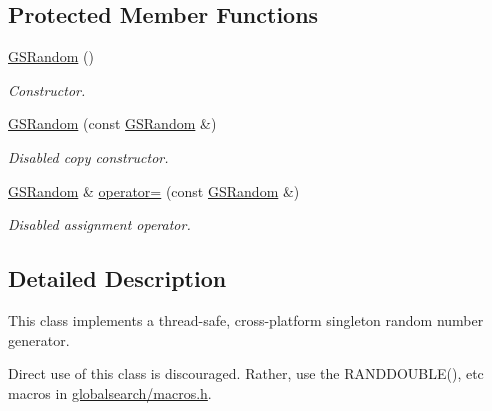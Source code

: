 \subsection*{Protected Member Functions}
\begin{DoxyCompactItemize}
\item 
\hypertarget{classGlobalSearch_1_1GSRandom_a87c1478f68605a85be05376799898185}{\hyperlink{classGlobalSearch_1_1GSRandom_a87c1478f68605a85be05376799898185}{G\-S\-Random} ()}\label{classGlobalSearch_1_1GSRandom_a87c1478f68605a85be05376799898185}

\begin{DoxyCompactList}\small\item\em Constructor. \end{DoxyCompactList}\item 
\hypertarget{classGlobalSearch_1_1GSRandom_a43fb2fb498f272c8150e59e58ca8ce37}{\hyperlink{classGlobalSearch_1_1GSRandom_a43fb2fb498f272c8150e59e58ca8ce37}{G\-S\-Random} (const \hyperlink{classGlobalSearch_1_1GSRandom}{G\-S\-Random} \&)}\label{classGlobalSearch_1_1GSRandom_a43fb2fb498f272c8150e59e58ca8ce37}

\begin{DoxyCompactList}\small\item\em Disabled copy constructor. \end{DoxyCompactList}\item 
\hypertarget{classGlobalSearch_1_1GSRandom_ac4d2afd7e581d4d3daa9def13f34f11a}{\hyperlink{classGlobalSearch_1_1GSRandom}{G\-S\-Random} \& \hyperlink{classGlobalSearch_1_1GSRandom_ac4d2afd7e581d4d3daa9def13f34f11a}{operator=} (const \hyperlink{classGlobalSearch_1_1GSRandom}{G\-S\-Random} \&)}\label{classGlobalSearch_1_1GSRandom_ac4d2afd7e581d4d3daa9def13f34f11a}

\begin{DoxyCompactList}\small\item\em Disabled assignment operator. \end{DoxyCompactList}\end{DoxyCompactItemize}


\subsection{Detailed Description}
This class implements a thread-\/safe, cross-\/platform singleton random number generator. 

Direct use of this class is discouraged. Rather, use the R\-A\-N\-D\-D\-O\-U\-B\-L\-E(), etc macros in \hyperlink{macros_8h_source}{globalsearch/macros.\-h}.

